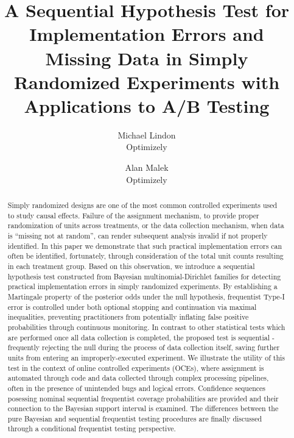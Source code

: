 \documentclass[11pt]{article}
\begin{document}
\vspace{-1in}
\title{A Sequential Hypothesis Test for Implementation Errors and Missing Data in Simply Randomized Experiments with Applications to A/B Testing}
\author{\Large Michael Lindon \\ Optimizely \and \Large Alan Malek \\ Optimizely}
\maketitle 
\begin{abstract}
  Simply randomized designs are one of the most common controlled experiments used to study causal effects.
  Failure of the assignment mechanism, to provide proper randomization of units across treatments, or the data collection mechanism, when data is ``missing not at random'', can render subsequent analysis invalid if not properly identified.
In this paper we demonstrate that such practical implementation errors can often be identified, fortunately, through consideration of the total unit counts resulting in each treatment group.
  Based on this observation, we introduce a sequential hypothesis test constructed from Bayesian multinomial-Dirichlet families for detecting practical implementation errors in simply randomized experiments.
By establishing a Martingale property of the posterior odds under the null hypothesis, frequentist Type-I error is controlled under both optional stopping and continuation via maximal inequalities, preventing practitioners from potentially inflating false positive probabilities through continuous monitoring.
  In contrast to other statistical tests which are performed once all data collection is completed, the proposed test is sequential - frequently rejecting the null during the process of data collection itself, saving further units from entering an improperly-executed experiment.
  We illustrate the utility of this test in the context of online controlled experiments (OCEs), where assignment is automated through code and data collected through complex processing pipelines, often in the presence of unintended bugs and logical errors.
Confidence sequences posessing nominal sequential frequentist coverage probabilities are provided and their connection to the Bayesian support interval is examined.
The differences between the pure Bayesian and sequential frequentist testing procedures are finally discussed through a conditional frequentist testing perspective.
 
\end{abstract}
\end{document}
